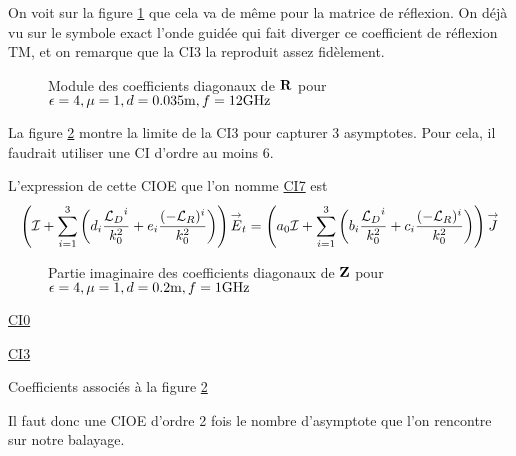       On voit sur la figure \ref{fig:reflex_fourier:plan:soudais:hoibc} que cela va de même pour la matrice de réflexion. On déjà vu sur le symbole exact l'onde guidée qui fait diverger ce coefficient de réflexion TM, et on remarque que la CI3 la reproduit assez fidèlement.
      \begin{figure}[!hbt]
          \centering
          
          \caption[CIOE sur empilement de P.~Soudais p.~11]{Module des coefficients diagonaux de \(\mathbf{R}\) pour \(\epsilon = 4, \mu = 1, d=0.035\text{m}, f=12\text{GHz}\)}
          \label{fig:reflex_fourier:plan:soudais:hoibc}
      \end{figure}

      La figure \ref{fig:imp_fourier:plan:triple_asymptote:hoibc} montre la limite de la CI3 pour capturer 3 asymptotes. Pour cela, il faudrait utiliser une CI d'ordre au moins 6.

      L'expression de cette CIOE que l'on nomme \hyperlink{ci7}{CI7} est
      \begin{equation}
        \left({\mathcal{I}} + \sum_{i=1}^3 \left(d_{i} \dfrac{{\mathcal{L}_D}^i}{k_0^2} + e_{i} \dfrac{(-{\mathcal{L}_R})^i}{k_0^2} \right)\right){\overset{\rightarrow}{E}}_t = \left(a_0 {\mathcal{I}} + \sum_{i=1}^3 \left(b_{i} \dfrac{{\mathcal{L}_D}^i}{k_0^2} + c_{i} \dfrac{(-{\mathcal{L}_R})^i}{k_0^2} \right)\right){\overset{\rightarrow}{J}}
      \end{equation}

      \begin{figure}[!hbt]
          \centering
          
          \caption[CIOE sur empilement avec triple asymptote]{Partie imaginaire des coefficients diagonaux de \(\mathbf{Z}\) pour \(\epsilon = 4, \mu = 1, d=0.2\text{m}, f=1\text{GHz}\)}
          \label{fig:imp_fourier:plan:triple_asymptote:hoibc}
      \end{figure}
      \begin{table}[!hbt]
        \centering
        \begin{minipage}[t]{0.49\textwidth}
        \vspace{0pt}
        \centering
        \begin{coefftable}{\hyperlink{ci0}{CI0}}
          
        \end{coefftable}

        \begin{coefftable}{\hyperlink{ci3}{CI3}}
          
        \end{coefftable}
        \end{minipage}
        \caption{Coefficients associés à la figure \ref{fig:imp_fourier:plan:triple_asymptote:hoibc}}
        \label{tab:imp_fourier:plan:triple_asymptote:hoibc}
      \end{table}
      Il faut donc une CIOE d'ordre 2 fois le nombre d'asymptote que l'on rencontre sur notre balayage.


